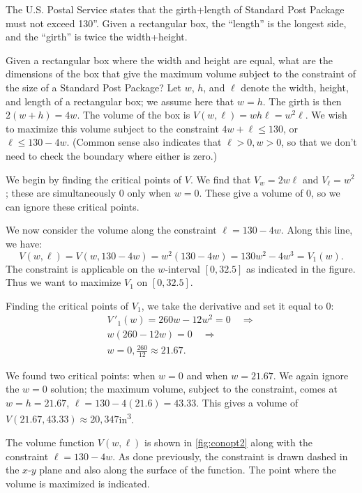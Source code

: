 \begin{example}\label{ex_conopt2}
The U.S. Postal Service states that the girth+length of Standard Post Package must not exceed 130''. Given a rectangular box, the ``length'' is the longest side, and the ``girth'' is twice the width+height.

Given a rectangular box where the width and height are equal, what are the dimensions of the box that give the maximum volume subject to the constraint of the size of a Standard Post Package?
\solution
Let $w$, $h$, and $\ell$ denote the width, height, and length of a rectangular box; we assume here that $w=h$. The girth is then $2(w+h) = 4w$. The volume of the box is $V(w,\ell) = wh\ell = w^2\ell$. We wish to maximize this volume subject to the constraint $4w+\ell\leq 130$, or $\ell\leq 130-4w$. (Common sense also indicates that $\ell>0, w>0$, so that we don't need to check the boundary where either is zero.)

We begin by finding the critical points of $V$. We find that $V_w = 2w\ell$ and $V_\ell = w^2$; these are simultaneously 0 only when $w=0$. These give a volume of 0, so we can ignore these critical points. 

We now consider the volume along the constraint $\ell=130-4w.$ Along this line, we have:
\[V(w,\ell) = V(w,130-4w) = w^2(130-4w) = 130w^2-4w^3 = V_1(w).\]
The constraint is applicable on the $w$-interval $[0,32.5]$ as indicated in the figure. Thus we want to maximize $V_1$ on $[0,32.5]$. 

Finding the critical points of $V_1$, we take the derivative and set it equal to 0:
\begin{multline*}
 V\,'_1(w) = 260w-12w^2 = 0 \quad \Rightarrow \\
 w(260-12w)= 0 \quad \Rightarrow \\
 w=0,\frac{260}{12}\approx 21.67.
\end{multline*}

We found two critical points: when $w=0$ and when $w=21.67$. We again ignore the $w=0$ solution; the maximum volume, subject to the constraint, comes at $w=h=21.67$, $\ell = 130-4(21.6) =43.33.$ This gives a volume of $V(21.67,43.33) \approx 20{,}347$in\textsuperscript3. 


The volume function $V(w,\ell)$ is shown in \autoref{fig:conopt2} along with the constraint $\ell = 130-4w$. As done previously, the constraint is drawn dashed in the $x$-$y$ plane and also along the surface of the function. The point where the volume is maximized is indicated.
\end{example}

